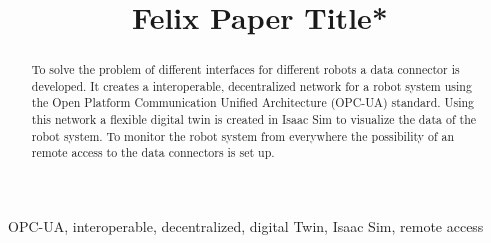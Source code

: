 \documentclass[conference]{IEEEtran}
\begin{document}
\title{Felix Paper Title*}

\author{
\and
{}
\and
{}
}

\maketitle

\begin{abstract}
To solve the problem of different interfaces for different robots a data connector is developed.
It creates a interoperable, decentralized network for a robot system using the Open Platform Communication Unified Architecture (OPC-UA) standard.
Using this network a flexible digital twin is created in Isaac Sim to visualize the data of the robot system.
To monitor the robot system from everywhere the possibility of an remote access to the data connectors is set up.
\end{abstract}

\begin{IEEEkeywords}
OPC-UA, interoperable, decentralized, digital Twin, Isaac Sim, remote access
\end{IEEEkeywords}
\end{document}
